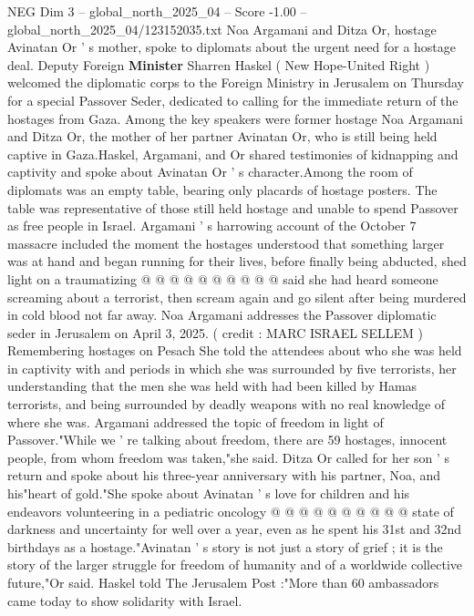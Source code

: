 \begin{textsample}{NEG Dim 3 – global\_north\_2025\_04 – Score -1.00 – global\_north\_2025\_04/123152035.txt}  \label{ex:f3_neg_406}
Noa Argamani and Ditza Or, hostage Avinatan Or ' s mother, spoke to diplomats about the urgent need for a hostage deal.
Deputy Foreign \textbf{Minister} Sharren Haskel ( New Hope-United Right ) welcomed the diplomatic corps to the Foreign Ministry in Jerusalem on Thursday for a special Passover Seder, dedicated to calling for the immediate return of the hostages from Gaza.
Among the key speakers were former hostage Noa Argamani and Ditza Or, the mother of her partner Avinatan Or, who is still being held captive in Gaza.Haskel, Argamani, and Or shared testimonies of kidnapping and captivity and spoke about Avinatan Or ' s character.Among the room of diplomats was an empty table, bearing only placards of hostage posters.
The table was representative of those still held hostage and unable to spend Passover as free people in Israel.
Argamani ' s harrowing account of the October 7 massacre included the moment the hostages understood that something larger was at hand and began running for their lives, before finally being abducted, shed light on a traumatizing @ @ @ @ @ @ @ @ @ @ said she had heard someone screaming about a terrorist, then scream again and go silent after being murdered in cold blood not far away.
Noa Argamani addresses the Passover diplomatic seder in Jerusalem on April 3, 2025. ( credit : MARC ISRAEL SELLEM ) Remembering hostages on Pesach She told the attendees about who she was held in captivity with and periods in which she was surrounded by five terrorists, her understanding that the men she was held with had been killed by Hamas terrorists, and being surrounded by deadly weapons with no real knowledge of where she was.
Argamani addressed the topic of freedom in light of Passover."While we ' re talking about freedom, there are 59 hostages, innocent people, from whom freedom was taken,"she said.
Ditza Or called for her son ' s return and spoke about his three-year anniversary with his partner, Noa, and his"heart of gold."She spoke about Avinatan ' s love for children and his endeavors volunteering in a pediatric oncology @ @ @ @ @ @ @ @ @ @ state of darkness and uncertainty for well over a year, even as he spent his 31st and 32nd birthdays as a hostage."Avinatan ' s story is not just a story of grief ; it is the story of the larger struggle for freedom of humanity and of a worldwide collective future,"Or said.
Haskel told The Jerusalem Post :"More than 60 ambassadors came today to show solidarity with Israel.

\end{textsample}

